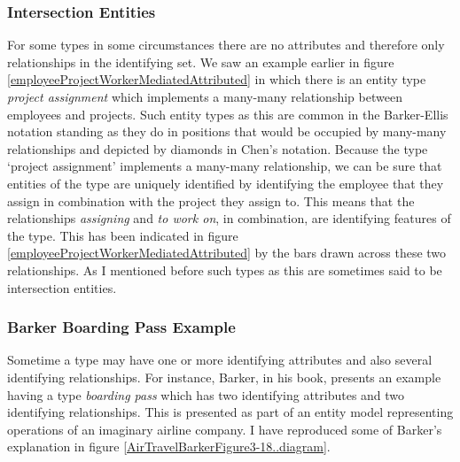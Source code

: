 \subsubsection{Intersection Entities}
\mynote 
{}
For some types in some circumstances there are no attributes and therefore only relationships in the identifying set. 
We saw an example earlier
in figure \ref{employeeProjectWorkerMediatedAttributed} in  which there is an entity type
\textit{project assignment} which implements a many-many relationship between employees and projects. 
Such entity types as this are common in the Barker-Ellis notation 
standing as they do in positions that would be occupied by many-many relationships
 and depicted by  diamonds in Chen's notation. 
 Because the type `project assignment' implements a many-many relationship, we can be sure that entities of the type  are uniquely identified by 
 identifying the employee that they assign in combination with the project they assign to. This means that the relationships \textit{assigning} and \textit{to work on}, in combination, are identifying features of the type. This has been indicated in 
figure  \ref{employeeProjectWorkerMediatedAttributed} by the bars drawn across these two relationships. As I mentioned before such types as this are sometimes said to be intersection entities.
\subsubsection{Barker Boarding Pass Example}
Sometime a type may have one or more identifying attributes and also several identifying relationships.
For instance, Barker, in his book, presents an example having a type \textit{boarding pass} which has two identifying attributes and two identifying relationships. This is presented as
part of  an entity model representing operations of an imaginary airline company.
I have reproduced some of Barker's explanation in figure \ref{AirTravelBarkerFigure3-18..diagram}. 


